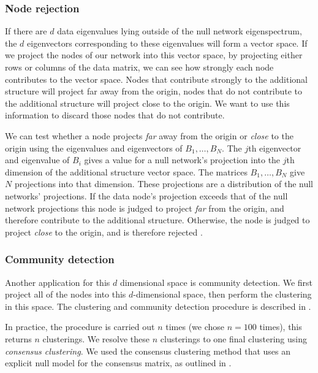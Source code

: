         \subsubsection{Node rejection}\label{sec:node_rejection}
        If there are $d$ data eigenvalues lying outside of the null network eigenspectrum, the $d$ eigenvectors corresponding to these eigenvalues will form a vector space. If we project the nodes of our network into this vector space, by projecting either rows or columns of the data matrix, we can see how strongly each node contributes to the vector space. Nodes that contribute strongly to the additional structure will project far away from the origin, nodes that do not contribute to the additional structure will project close to the origin. We want to use this information to discard those nodes that do not contribute.

        We can test whether a node projects \textit{far} away from the origin or \textit{close} to the origin using the eigenvalues and eigenvectors of $B_1, \dots, B_N$. The $j$th eigenvector and eigenvalue of $B_i$ gives a value for a null network's projection into the $j$th dimension of the additional structure vector space. The matrices $B_1, \dots, B_N$ give $N$ projections into that dimension. These projections are a distribution of the null networks' projections. If the data node's projection exceeds that of the null network projections this node is judged to project \textit{far} from the origin, and therefore contribute to the additional structure. Otherwise, the node is judged to project \textit{close} to the origin, and is therefore rejected  \parencite{humphries}.

        \subsubsection{Community detection}\label{sec:community_detection}
        Another application for this $d$ dimensional space is community detection. We first project all of the nodes into this $d$-dimensional space, then perform the clustering in this space. The clustering and community detection procedure is described in  \parencite{humphries2}.

        In practice, the procedure is carried out $n$ times (we chose $n=100$ times), this returns $n$ clusterings. We resolve these $n$ clusterings to one final clustering using \textit{consensus clustering}. We used the consensus clustering method that uses an explicit null model for the consensus matrix, as outlined in  \parencite{humphries}.

